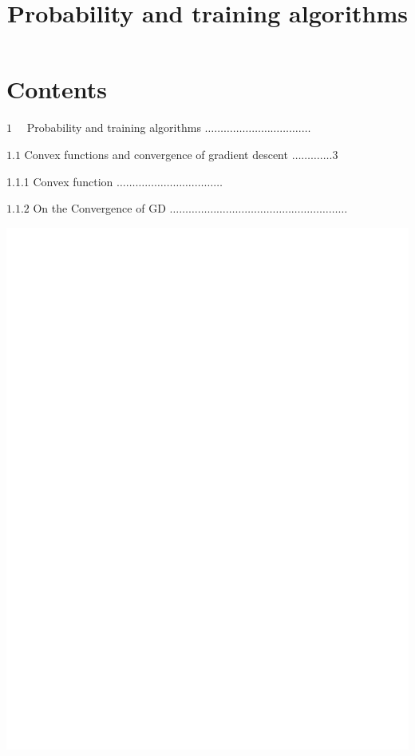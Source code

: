 \documentclass[10pt]{article}
\title{Probability and training algorithms }
\author{}
\date{}
\begin{document}
\maketitle
\section{Contents}
$1 \quad$ Probability and training algorithms $\ldots \ldots \ldots \ldots \ldots \ldots \ldots \ldots \ldots \ldots . \ldots$

$1.1$ Convex functions and convergence of gradient descent $\ldots \ldots \ldots \ldots .3$

1.1.1 Convex function $\ldots \ldots \ldots \ldots \ldots \ldots \ldots \ldots . \ldots \ldots \ldots$

$1.1 .2$ On the Convergence of GD $\ldots \ldots \ldots \ldots \ldots \ldots \ldots \ldots \ldots \ldots \ldots \ldots \ldots \ldots \ldots \ldots \ldots \ldots \ldots$

\includegraphics[max width=\textwidth]{2022_03_25_9faca01b68c57c6da639g-2}
\end{document}
